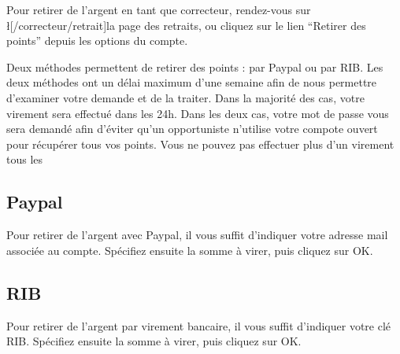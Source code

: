 ﻿Pour retirer de l'argent en tant que correcteur, rendez-vous sur \l[/correcteur/retrait]{la page des retraits}, ou cliquez sur le lien “Retirer des points” depuis les options du compte.

Deux méthodes permettent de retirer des points : par Paypal ou par RIB.
Les deux méthodes ont un délai maximum d'une semaine afin de nous permettre d'examiner votre demande et de la traiter. Dans la majorité des cas, votre virement sera effectué dans les 24h.
Dans les deux cas, votre mot de passe vous sera demandé afin d'éviter qu'un opportuniste n'utilise votre compote ouvert pour récupérer tous vos points.
Vous ne pouvez pas effectuer plus d'un virement tous les %

\subsection{Paypal}
Pour retirer de l'argent avec Paypal, il vous suffit d'indiquer votre adresse mail associée au compte.
Spécifiez ensuite la somme à virer, puis cliquez sur OK.

\subsection{RIB}
Pour retirer de l'argent par virement bancaire, il vous suffit d'indiquer votre clé RIB.
Spécifiez ensuite la somme à virer, puis cliquez sur OK.